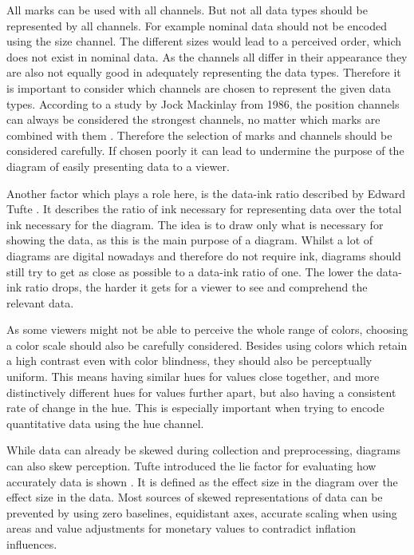 All marks can be used with all channels. But not all data types should be represented by all channels. For example nominal data should not be encoded using the size channel. The different sizes would lead to a perceived order, which does not exist in nominal data. As the channels all differ in their appearance they are also not equally good in adequately representing the data types. Therefore it is important to consider which channels are chosen to represent the given data types. According to a study by Jock Mackinlay from 1986, the position channels can always be considered the strongest channels, no matter which marks are combined with them \cite{mackinlay1986automating}. Therefore the selection of marks and channels should be considered carefully. If chosen poorly it can lead to undermine the purpose of the diagram of easily presenting data to a viewer.

Another factor which plays a role here, is the data-ink ratio described by Edward Tufte \cite{tufte}. It describes the ratio of ink necessary for representing data over the total ink necessary for the diagram. The idea is to draw only what is necessary for showing the data, as this is the main purpose of a diagram. Whilst a lot of diagrams are digital nowadays and therefore do not require ink, diagrams should still try to get as close as possible to a data-ink ratio of one. The lower the data-ink ratio drops, the harder it gets for a viewer to see and comprehend the relevant data.

As some viewers might not be able to perceive the whole range of colors, choosing a color scale should also be carefully considered. Besides using colors which retain a high contrast even with color blindness, they should also be perceptually uniform. This means having similar hues for values close together, and more distinctively different hues for values further apart, but also having a consistent rate of change in the hue. This is especially important when trying to encode quantitative data using the hue channel.

While data can already be skewed during collection and preprocessing, diagrams can also skew perception. Tufte introduced the lie factor for evaluating how accurately data is shown \cite{tuftevisual}. It is defined as the effect size in the diagram over the effect size in the data. Most sources of skewed representations of data can be prevented by using zero baselines, equidistant axes, accurate scaling when using areas and value adjustments for monetary values to contradict inflation influences.


